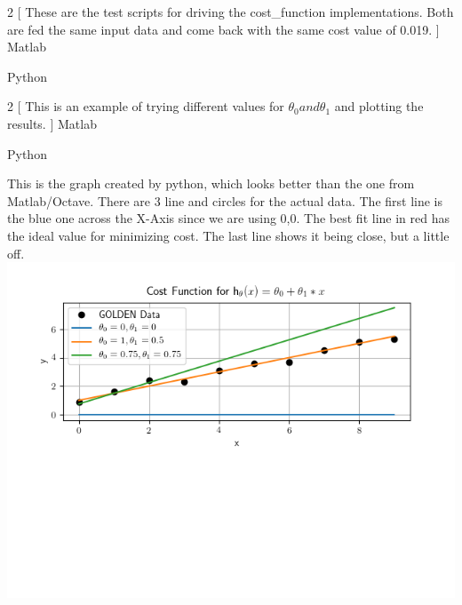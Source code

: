 \newpage
\begin{multicols}{2}
  [
    These are the test scripts for driving the cost\_function implementations.  Both are fed the same input data and come back with the same cost value of 0.019.
  ]
  Matlab\\
  \columnbreak

  Python\\
  
\end{multicols}

\newpage
\begin{multicols}{2}
  [
    This is an example of trying different values for $\theta_{0} and \theta_{1}$ and plotting the results.
  ]
  Matlab\\
  \columnbreak

  Python\\
  
\end{multicols}

This is the graph created by python, which looks better than the one from Matlab/Octave.  There are 3 line and circles for the actual data.  The first line is the blue one across the X-Axis since we are using 0,0.  The best fit line in red has the ideal value for minimizing cost.  The last line shows it being close, but a little off.\\

\includegraphics{python/plot_cost_function.png}\\


